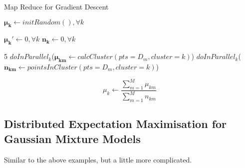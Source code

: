 \documentclass[a4paper]{article}
\begin{document}
	\begin{algorithm}
		\caption{Map Reduce for Gradient Descent}
		\begin{algorithmic}[6]
			  
			
			\State $\mathbf{\mu_k} \gets initRandom(), \forall k$ 
			
			
			\State $\mathbf{\mu_k'} \gets 0, \forall k$ 
			\State $\mathbf{n_k} \gets 0, \forall k$ 
			
			5
			\State $doInParallel_k$($\mathbf{\mu_{km}} \gets calcCluster(pts=D_m,cluster=k)$)
			\State $doInParallel_k$($\mathbf{n_{km}} \gets pointsInCluster(pts=D_m,cluster=k)$)
			
			
			\State $$\mu_k \gets \frac{\sum_{m=1}^{M} \mu_{km}}{\sum_{m=1}^{M}n_{km}}$$
			
			\EndWhile
			
			\EndProcedure
		\end{algorithmic}
	\end{algorithm}
	
	\subsection{Distributed Expectation Maximisation for Gaussian Mixture Models}
	
	Similar to the above examples, but a little more complicated.
	
	
	
	
\end{document}
